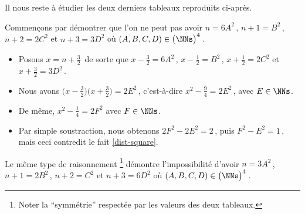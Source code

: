 \vspace{-1.5ex}
Il nous reste à étudier les deux derniers tableaux reproduits ci-après.

\begin{center}
\end{center}


Commençons par démontrer que l'on ne peut pas avoir 
$n = 6 A^2$\,, $n + 1 = B^2$\,, $n + 2 = 2 C^2$ et $n + 3 = 3 D^2$ 
où $(A, B, C, D) \in \big( \NNs \big)^4$\,.

\begin{itemize}
	\item Posons $x = n + \frac32$\, de sorte que 
	$x - \frac32 = 6 A^2$\,, $x - \frac12 = B^2$\,, $x + \frac12 = 2 C^2$ et $x + \frac32 = 3 D^2$\,.

	\item Nous avons
	$\big( x - \frac32 \big) \big( x + \frac32 \big) = 2 E^2$\,, c'est-à-dire $x^2 - \frac94 = 2 E^2$\,, avec $E \in \NNs$.

	\item De même,
	$x^2 - \frac14 = 2 F^2$ avec $F \in \NNs$.	

	\item Par simple soustraction, nous obtenons $2 F^2 - 2 E^2 = 2$\,, puis $F^2 - E^2 = 1$\,, mais ceci contredit le fait \ref{dist-square}.
\end{itemize}


Le même type de raisonnement
\footnote{
	Noter la \enquote{symmétrie} respectée par les valeurs des deux tableaux.
}
démontre l'impossibilité d'avoir 
$n = 3 A^2$\,, $n + 1 = 2 B^2$\,, $n + 2 = C^2$ et $n + 3 = 6 D^2$ 
où $(A, B, C, D) \in \big( \NNs \big)^4$\,.

